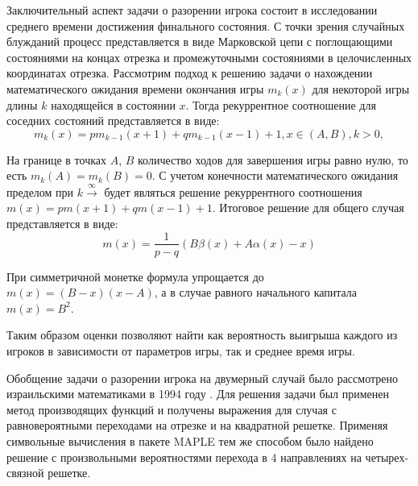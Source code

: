 Заключительный аспект задачи о разорении игрока состоит в исследовании среднего времени достижения финального состояния. С точки зрения случайных блужданий процесс представляется в виде Марковской цепи с поглощающими состояниями на концах отрезка и промежуточными состояниями в целочисленных координатах отрезка. Рассмотрим подход к решению задачи о нахождении математического ожидания времени окончания игры $m_k(x)$ для некоторой игры длины $k$ находящейся в состоянии $x$. Тогда рекуррентное соотношение для соседних состояний представляется в виде:
\begin{equation}
    \label{eq:eq5}
    m_k(x) = p m_{k-1}(x + 1) + q m_{k-1}(x - 1) + 1, x \in (A, B), k > 0,
\end{equation}

На границе в точках $A$, $B$ количество ходов для завершения игры равно нулю, то есть $m_k(A) = m_k(B) = 0$. С учетом конечности математического ожидания пределом при $k \xrightarrow \infty$ будет являться решение рекуррентного соотношения $m(x)=p m(x+1) +q m(x - 1) + 1$. Итоговое решение для общего случая представляется в виде:
\begin{equation}
    \label{eq:eq6}
    m(x) = \frac{1}{p - q} (B \beta(x) + A \alpha(x) - x)
\end{equation}

При симметричной монетке формула упрощается до $m(x) = (B - x) (x - A)$, а в случае равного начального капитала $m(x) = B^2$.

Таким образом оценки позволяют найти как вероятность выигрыша каждого из игроков в зависимости от параметров игры, так и среднее время игры.

Обобщение задачи о разорении игрока на двумерный случай было рассмотрено израильскими математиками в 1994 году \cite{orr_computer_1994}. Для решения задачи был применен метод производящих функций и получены выражения для случая с равновероятными переходами на отрезке и на квадратной решетке. Применяя символьные вычисления в пакете MAPLE \cite{monagan2012maple} тем же способом было найдено решение с произвольными вероятностями перехода в 4 направлениях на четырех-связной решетке. 


